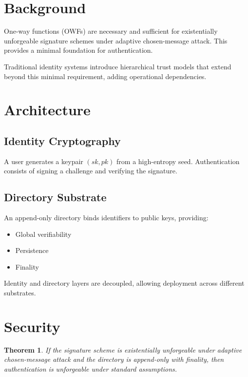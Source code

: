 \documentclass[11pt,a4paper]{article}
\newtheorem{theorem}{Theorem}[section]
\begin{document}
\section{Background}

One-way functions (OWFs) are necessary and sufficient for existentially unforgeable signature schemes under adaptive chosen-message attack. This provides a minimal foundation for authentication.

Traditional identity systems introduce hierarchical trust models that extend beyond this minimal requirement, adding operational dependencies.

\section{Architecture}

\subsection{Identity Cryptography}

A user generates a keypair $(sk, pk)$ from a high-entropy seed. Authentication consists of signing a challenge and verifying the signature.

\subsection{Directory Substrate}

An append-only directory binds identifiers to public keys, providing:

\begin{itemize}
\item Global verifiability
\item Persistence
\item Finality
\end{itemize}

Identity and directory layers are decoupled, allowing deployment across different substrates.

\section{Security}

\begin{theorem}
If the signature scheme is existentially unforgeable under adaptive chosen-message attack and the directory is append-only with finality, then authentication is unforgeable under standard assumptions.
\end{theorem}
\end{document}
